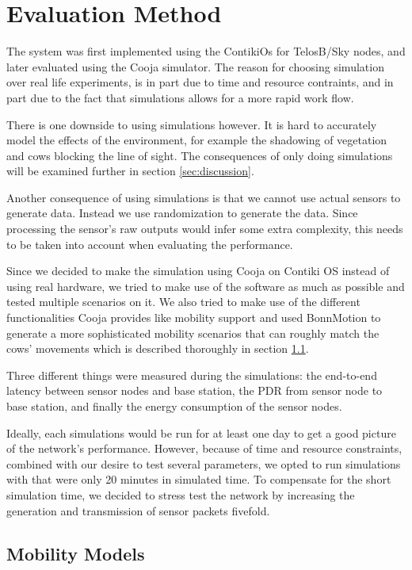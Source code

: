 \documentclass[conference]{IEEEtran}
\begin{document}
\section{Evaluation Method}

The system was first implemented using the ContikiOs for TelosB/Sky nodes, and
later evaluated using the Cooja simulator. The reason for choosing simulation
over real life experiments, is in part due to time and resource contraints, and
in part due to the fact that simulations allows for a more rapid work flow.

There is one downside to using simulations however. It is hard to accurately
model the effects of the environment, for example the shadowing of vegetation
and cows blocking the line of sight. The consequences of only doing simulations
will be examined further in section \ref{sec:discussion}.

Another consequence of using simulations is that we cannot use actual sensors
to generate data. Instead we use randomization to generate the data. Since
processing the sensor's raw outputs would infer some extra complexity, this
needs to be taken into account when evaluating the performance.

Since we decided to make the simulation using Cooja on Contiki OS instead of
using real hardware, we tried to make use of the software as much as possible
and tested multiple scenarios on it. We also tried to make use of the different
functionalities Cooja provides like mobility support and used BonnMotion to
generate a more sophisticated mobility scenarios that can roughly match the
cows’ movements which is described thoroughly in section \ref{sec:mobility}.

Three different things were measured during the simulations: the end-to-end latency
between sensor nodes and base station, the PDR from sensor node to base station,
and finally the energy consumption of the sensor nodes.

Ideally, each simulations would be run for at least one day to get a good
picture of the network's performance. However, because of time and resource
constraints, combined with our desire to test several parameters, we opted to
run simulations with that were only 20 minutes in simulated time. To compensate
for the short simulation time, we decided to stress test the network by
increasing the generation and transmission of sensor packets fivefold.

\subsection{Mobility Models} \label{sec:mobility}
\end{document}
